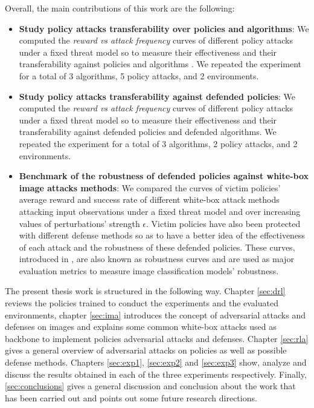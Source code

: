 Overall, the main contributions of this work are the following:
\begin{itemize}
    \item \textbf{Study policy attacks transferability over policies and algorithms}: We computed the {\it reward vs attack frequency} curves of different policy attacks under a fixed threat model so to measure their effectiveness and their transferability against policies and algorithms \cite{huang2017adversarial}. We repeated the experiment for a total of 3 algorithms, 5 policy attacks, and 2 environments.
    \item \textbf{Study policy attacks transferability against defended policies}: We computed the {\it reward vs attack frequency} curves of different policy attacks under a fixed threat model so to measure their effectiveness and their transferability against defended policies and defended algorithms. We repeated the experiment for a total of 3 algorithms, 2 policy attacks, and 2 environments.
    \item \textbf{Benchmark of the robustness of defended policies against white-box image attacks methods}: We compared the curves of victim policies' average reward and success rate of different white-box attack methods attacking input observations under a fixed threat model and over increasing values of perturbations' strength \(\epsilon\). Victim policies have also been protected with different defense methods so as to have a better idea of the effectiveness of each attack and the robustness of these defended policies. These curves, introduced in \cite{dong2019benchmarking}, are also known as robustness curves and are used as major evaluation metrics to measure image classification models' robustness.
\end{itemize}

The present thesis work is structured in the following way. Chapter \ref{sec:drl} reviews the policies trained to conduct the experiments and the evaluated environments, chapter \ref{sec:ima} introduces the concept of adversarial attacks and defenses on images and explains some common white-box attacks used as backbone to implement policies adversarial attacks and defenses. Chapter \ref{sec:rla} gives a general overview of adversarial attacks on policies as well as possible defense methods. Chapters \ref{sec:exp1}, \ref{sec:exp2} and \ref{sec:exp3} show, analyze and discuss the results obtained in each of the three experiments respectively. Finally, \ref{sec:conclusions} gives a general discussion and conclusion about the work that has been carried out and points out some future research directions.
      